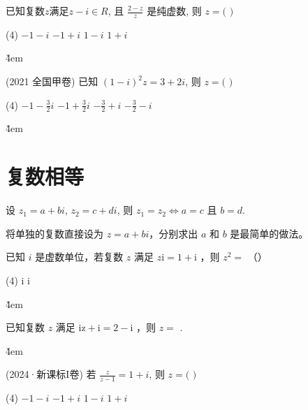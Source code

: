 \begin{example}
    已知复数$z$满足$z-i\in R$, 且 $\frac{2-z}{z}$ 是纯虚数, 则 $z=($ \quad $)$
    \begin{tasks}(4)
        \task $-1-i$
        \task $-1+i$
        \task $1-i$
        \task $1+i$
    \end{tasks}
\end{example}

\v{4em}

\begin{example}(2021 全国甲卷)
    已知 $(1-i)^{2}z=3+2i$, 则 $z=($ \quad $)$
    \begin{tasks}(4)
        \task $-1-\frac{3}{2}i$
        \task $-1+\frac{3}{2}i$
        \task $-\frac{3}{2}+i$
        \task $-\frac{3}{2}-i$
    \end{tasks}
\end{example}

\v{4em}

\section{复数相等}

\begin{definition}[复数相等]
    设 $z_{1}=a+bi$, $z_{2}=c+di$, 则 $z_{1}=z_{2}\Leftrightarrow a=c$ 且 $b=d$.
\end{definition}

\begin{theorem}[分离法求 $z$]
    将单独的复数直接设为 $z = a + bi$，分别求出 $a$ 和 $b$ 是最简单的做法。
\end{theorem}

\begin{example}
    已知 $i$ 是虚数单位，若复数 $z$ 满足 $z \mathrm{i}=1+\mathrm{i}$ ，则 $z^2=$ （\qquad）
    \begin{tasks}(4)
         i
         i
    \end{tasks}
\end{example}

\v{4em}

\begin{example}
    已知复数 $z$ 满足 $\mathrm{iz}+\mathrm{i}=2-\mathrm{i}$ ，则 $z=$ \underline{\qquad}.
\end{example}

\v{4em}

\begin{example}(2024·新课标I卷)
    若 $\frac{z}{z-1}=1+i$, 则 $z=($ \quad $)$
    \begin{tasks}(4)
        \task $-1-i$
        \task $-1+i$
        \task $1-i$
        \task $1+i$
    \end{tasks}
\end{example}

